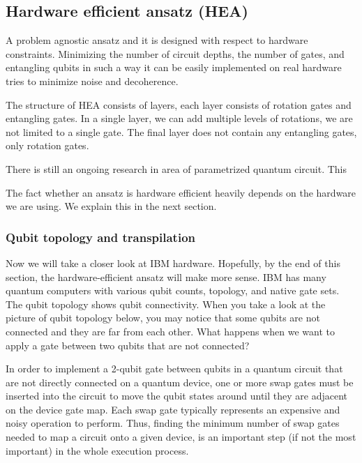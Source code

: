 \subsection{Hardware efficient ansatz (HEA)}
A problem agnostic ansatz and it is designed with respect to hardware constraints. Minimizing the number of circuit depths, the number of gates, and entangling qubits in such a way it can be easily implemented on real hardware tries to minimize noise and decoherence.

The structure of HEA consists of layers, each layer consists of rotation gates and entangling gates. In a single layer, we can add multiple levels of rotations, we are not limited to a single gate. The final layer does not contain any entangling gates, only rotation gates.

There is still an ongoing research in area of parametrized quantum circuit. This 


The fact whether an ansatz is hardware efficient heavily depends on the hardware we are using. We explain this in the next section.

\subsubsection{Qubit topology and transpilation}
Now we will take a closer look at IBM hardware. Hopefully, by the end of this section, the hardware-efficient ansatz will make more sense. IBM has many quantum computers with various qubit counts, topology, and native gate sets. The qubit topology shows qubit connectivity. When you take a look at the picture of qubit topology below, you may notice that some qubits are not connected and they are far from each other. What happens when we want to apply a gate between two qubits that are not connected? 


In order to implement a 2-qubit gate between qubits in a quantum circuit that are not directly connected on a quantum device, one or more swap gates must be inserted into the circuit to move the qubit states around until they are adjacent on the device gate map. Each swap gate typically represents an expensive and noisy operation to perform. Thus, finding the minimum number of swap gates needed to map a circuit onto a given device, is an important step (if not the most important) in the whole execution process.

